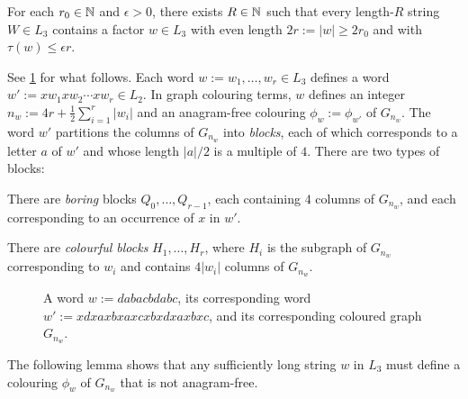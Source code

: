 \documentclass{patmorin}
\begin{document}
\begin{lem}\label{near_anagram_graph}
  For each $r_0\in\mathbb{N}$ and $\epsilon>0$, there exists $R\in\mathbb{N}$ such that every length-$R$ string $W\in L_3$ contains a factor $w\in L_3$ with even length $2r:=|w|\ge 2r_0$ and with $\tau(w)\le\epsilon r$.
\end{lem}



See \cref{bigexample} for what follows. Each word $w:=w_1,\ldots,w_r\in L_3$ defines a word $w':=xw_1xw_2\cdots xw_{r}\in L_2$.  In graph colouring terms, $w$ defines an integer $n_w:=4r+\tfrac{1}{2}\sum_{i=1}^r|w_i|$ and an anagram-free colouring $\phi_w:=\phi_{w'}$ of $G_{n_w}$. The word $w'$ partitions the columns of $G_{n_w}$ into \emph{blocks}, each of which corresponds to a letter $a$ of $w'$ and whose length $|a|/2$ is a multiple of $4$.  There are two types of blocks:
\begin{compactitem}
    \item There are \emph{boring} blocks $Q_0,\ldots,Q_{r-1}$, each containing $4$ columns of $G_{n_w}$, and each corresponding to an occurrence of $x$ in $w'$.
    \item There are \emph{colourful blocks} $H_1,\ldots,H_r$, where $H_i$ is the subgraph of $G_{n_w}$ corresponding to $w_i$ and contains $4|w_i|$ columns of $G_{n_w}$.
\end{compactitem}

\begin{figure}
    \caption{A word $w:=dabacbdabc$, its corresponding word $w':=xdxaxbxaxcxbxdxaxbxc$, and its corresponding coloured graph $G_{n_w}$.}
    \label{bigexample}
\end{figure}

The following lemma shows that any sufficiently long string $w$ in $L_3$ must define a colouring $\phi_w$ of $G_{n_w}$ that is not anagram-free.


\end{document}
